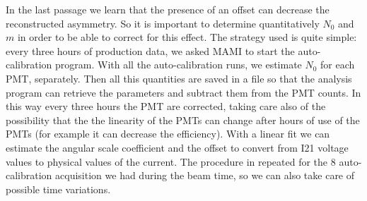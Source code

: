In the last passage we learn that the presence of an offset can decrease the reconstructed asymmetry. So it is important to determine quantitatively $N_{0}$ and $m$ in order to be able to correct for this effect. The strategy used is quite simple: every three hours of production data, we asked MAMI to start the auto-calibration program. With all the auto-calibration runs, we estimate $N_{0}$ for each PMT, separately. Then all this quantities are saved in a file so that the analysis program can retrieve the parameters and subtract them from the PMT counts.
In this way every three hours the PMT are corrected, taking care also of the possibility that the the linearity of the PMTs can change after hours of use of the PMTs (for example it can decrease the efficiency). With a linear fit we can estimate the angular scale coefficient and the offset to convert from I21 voltage values to physical values of the current. The procedure in repeated for the $8$ auto-calibration acquisition we had during the beam time, so we can also take care of possible time variations.

